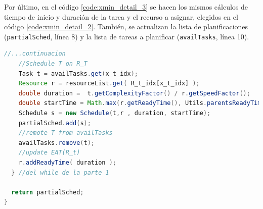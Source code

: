 Por último, en el código \ref{code:xmin_detail_3} se hacen los mismos cálculos de tiempo de inicio y duración de la tarea y el recurso a asignar, elegidos en el código \ref{code:xmin_detail_2}. También, se actualizan la lista de planificaciones (\texttt{partialSched}, línea 8) y la lista de tareas a planificar (\texttt{availTasks}, línea 10).

\begin{lstlisting}[language=java,label={code:xmin_detail_3},caption={Método de MaxMin/MinMin que planifica las tareas (parte 3)},float]
    //...continuacion
    //Schedule T on R_T
    Task t = availTasks.get(x_t_idx);
    Resource r = resourceList.get( R_t_idx[x_t_idx] );
    double duration =  t.getComplexityFactor() / r.getSpeedFactor();
    double startTime = Math.max(r.getReadyTime(), Utils.parentsReadyTime(t, partialSched, w));
    Schedule s = new Schedule(t,r , duration, startTime);
    partialSched.add(s);
    //remote T from availTasks
    availTasks.remove(t);
    //update EAT(R_t)
    r.addReadyTime( duration );
  } //del while de la parte 1

  return partialSched;
}
\end{lstlisting}
